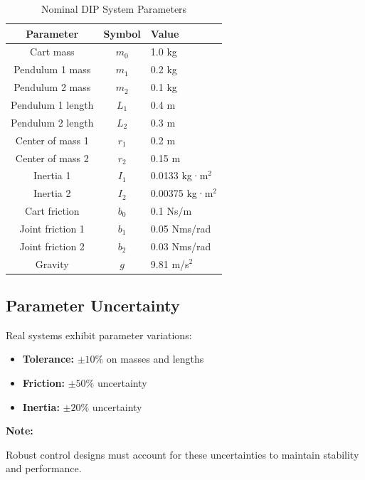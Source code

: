 \documentclass[11pt,a4paper]{article}
\newenvironment{note}[1][Note]{%
  \par\noindent\textcolor{noteblue}{\textbf{#1:}}\quad
}{\par}
\begin{document}
\begin{table}[h]
\centering
\begin{tabular}{c c l}
\toprule
\textbf{Parameter} & \textbf{Symbol} & \textbf{Value} \\
\midrule
Cart mass & $m_0$ & 1.0 kg \\
Pendulum 1 mass & $m_1$ & 0.2 kg \\
Pendulum 2 mass & $m_2$ & 0.1 kg \\
Pendulum 1 length & $L_1$ & 0.4 m \\
Pendulum 2 length & $L_2$ & 0.3 m \\
Center of mass 1 & $r_1$ & 0.2 m \\
Center of mass 2 & $r_2$ & 0.15 m \\
Inertia 1 & $I_1$ & 0.0133 kg·m$^2$ \\
Inertia 2 & $I_2$ & 0.00375 kg·m$^2$ \\
Cart friction & $b_0$ & 0.1 Ns/m \\
Joint friction 1 & $b_1$ & 0.05 Nms/rad \\
Joint friction 2 & $b_2$ & 0.03 Nms/rad \\
Gravity & $g$ & 9.81 m/s$^2$ \\
\bottomrule
\end{tabular}
\caption{Nominal DIP System Parameters}
\label{tab:nominal_parameters}
\end{table}

\subsection{Parameter Uncertainty}

Real systems exhibit parameter variations:
\begin{itemize}
    \item \textbf{Tolerance:} $\pm 10\%$ on masses and lengths
    \item \textbf{Friction:} $\pm 50\%$ uncertainty
    \item \textbf{Inertia:} $\pm 20\%$ uncertainty
\end{itemize}

\begin{note}
Robust control designs must account for these uncertainties to maintain stability and performance.
\end{note}

\end{document}

